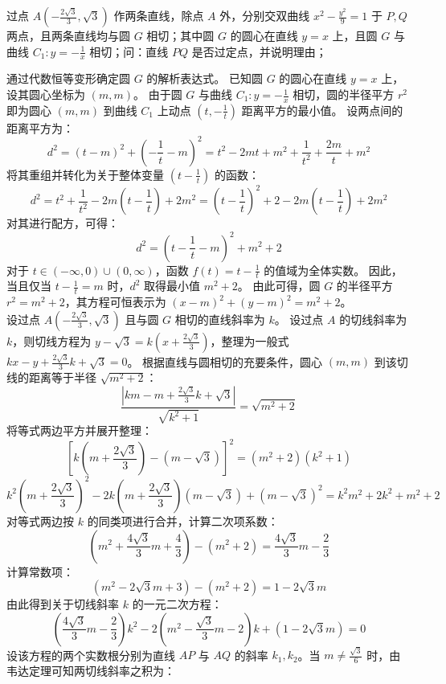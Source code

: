 \begin{example}
过点 \(A\left(-\frac{2\sqrt{3}}{3},\sqrt{3}\right)\) 作两条直线，除点 \(A\) 外，分别交双曲线 \(x^2 - \frac{y^2}{9} = 1\) 于 \(P,Q\) 两点，且两条直线均与圆 \(G\) 相切；其中圆 \(G\) 的圆心在直线 \(y = x\) 上，且圆 \(G\) 与曲线 \(C_1: y = -\frac{1}{x}\) 相切；问：直线 \(PQ\) 是否过定点，并说明理由；
\end{example}
\begin{solution}
通过代数恒等变形确定圆 $G$ 的解析表达式。
已知圆 $G$ 的圆心在直线 $y = x$ 上，设其圆心坐标为 $(m,m)$。
由于圆 $G$ 与曲线 $C_1: y = -\frac{1}{x}$ 相切，圆的半径平方 $r^2$ 即为圆心 $(m,m)$ 到曲线 $C_1$ 上动点 $\left(t, -\frac{1}{t}\right)$ 距离平方的最小值。
设两点间的距离平方为：
$$ d^2 = (t - m)^2 + \left(-\frac{1}{t} - m\right)^2 = t^2 - 2mt + m^2 + \frac{1}{t^2} + \frac{2m}{t} + m^2 $$
将其重组并转化为关于整体变量 $\left(t - \frac{1}{t}\right)$ 的函数：
$$ d^2 = t^2 + \frac{1}{t^2} - 2m\left(t - \frac{1}{t}\right) + 2m^2 = \left(t - \frac{1}{t}\right)^2 + 2 - 2m\left(t - \frac{1}{t}\right) + 2m^2 $$
对其进行配方，可得：
$$ d^2 = \left(t - \frac{1}{t} - m\right)^2 + m^2 + 2 $$
对于 $t \in (-\infty, 0) \cup (0, \infty)$，函数 $f(t) = t - \frac{1}{t}$ 的值域为全体实数。
因此，当且仅当 $t - \frac{1}{t} = m$ 时，$d^2$ 取得最小值 $m^2 + 2$。
由此可得，圆 $G$ 的半径平方 $r^2 = m^2 + 2$，其方程可恒表示为 $(x - m)^2 + (y - m)^2 = m^2 + 2$。\\
设过点 $A\left(-\frac{2\sqrt{3}}{3},\sqrt{3}\right)$ 且与圆 $G$ 相切的直线斜率为 $k$。
设过点 $A$ 的切线斜率为 $k$，则切线方程为 $y - \sqrt{3} = k\left(x + \frac{2\sqrt{3}}{3}\right)$，整理为一般式 $kx - y + \frac{2\sqrt{3}}{3}k + \sqrt{3} = 0$。
根据直线与圆相切的充要条件，圆心 $(m,m)$ 到该切线的距离等于半径 $\sqrt{m^2+2}$：
$$ \frac{\left|km - m + \frac{2\sqrt{3}}{3}k + \sqrt{3}\right|}{\sqrt{k^2+1}} = \sqrt{m^2+2} $$
将等式两边平方并展开整理：
$$ \left[ k\left(m + \frac{2\sqrt{3}}{3}\right) - (m - \sqrt{3}) \right]^2 = (m^2 + 2)(k^2 + 1) $$
$$ k^2\left(m + \frac{2\sqrt{3}}{3}\right)^2 - 2k\left(m + \frac{2\sqrt{3}}{3}\right)(m - \sqrt{3}) + (m - \sqrt{3})^2 = k^2 m^2 + 2k^2 + m^2 + 2 $$
对等式两边按 $k$ 的同类项进行合并，计算二次项系数：
$$ \left(m^2 + \frac{4\sqrt{3}}{3}m + \frac{4}{3}\right) - (m^2 + 2) = \frac{4\sqrt{3}}{3}m - \frac{2}{3} $$
计算常数项：
$$ (m^2 - 2\sqrt{3}m + 3) - (m^2 + 2) = 1 - 2\sqrt{3}m $$
由此得到关于切线斜率 $k$ 的一元二次方程：
$$ \left(\frac{4\sqrt{3}}{3}m - \frac{2}{3}\right)k^2 - 2\left(m^2 - \frac{\sqrt{3}}{3}m - 2\right)k + (1 - 2\sqrt{3}m) = 0 $$
设该方程的两个实数根分别为直线 $AP$ 与 $AQ$ 的斜率 $k_1, k_2$。当 $m \neq \frac{\sqrt{3}}{6}$ 时，由韦达定理可知两切线斜率之积为：

\end{solution}
